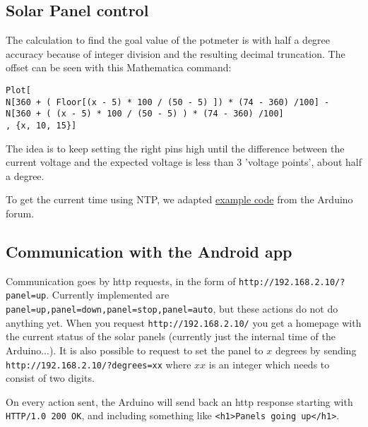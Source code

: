 \documentclass{article}
\begin{document}
		\subsection{Solar Panel control}
			The calculation to find the goal value of the potmeter is with half a degree accuracy because of integer division and the resulting decimal truncation. The offset can be seen with this Mathematica command:
			\begin{lstlisting}
Plot[
N[360 + ( Floor[(x - 5) * 100 / (50 - 5) ]) * (74 - 360) /100] - 
N[360 + ( (x - 5) * 100 / (50 - 5) ) * (74 - 360) /100]
, {x, 10, 15}]
			\end{lstlisting}
			The idea is to keep setting the right pins high until the difference between the current voltage and the expected voltage is less than 3 'voltage points', about half a degree.
			
			To get the current time using NTP, we adapted \href{http://forum.arduino.cc/index.php?topic=171941.0}{example code} from the Arduino forum.
			
		\subsection{Communication with the Android app}
			Communication goes by http requests, in the form of \verb|http://192.168.2.10/?panel=up|. Currently implemented are \verb|panel=up,panel=down,panel=stop,panel=auto|, but these actions do not do anything yet. When you request \verb|http://192.168.2.10/| you get a homepage with the current status of the solar panels (currently just the internal time of the Arduino...). It is also possible to request to set the panel to $x$ degrees by sending \verb|http://192.168.2.10/?degrees=xx| where $xx$ is an integer which needs to consist of two digits.
			
			On every action sent, the Arduino will send back an http response starting with \verb|HTTP/1.0 200 OK|, and including something like \verb|<h1>Panels going up</h1>|.
	
\end{document}
